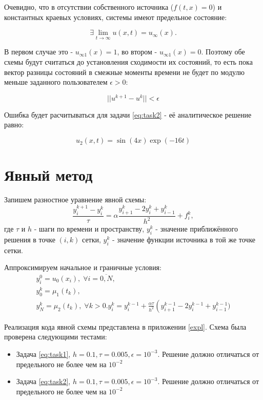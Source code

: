 Очевидно, что в отсутствии собственного источника ($f(t,x) = 0$) и константных краевых условиях, системы имеют предельное состояние:

\[\exists \lim\limits_{t \rightarrow \infty} u(x, t) = u_\infty (x).\]

В первом случае это - $u_{\infty1} (x) = 1$, во втором - $u_{\infty1} (x) = 0$. 
Поэтому обе схемы будут считаться до установления сходимости их состояний,
то есть пока вектор разницы состояний в смежные моменты времени не будет по модулю меньше заданного пользователем $\epsilon > 0$:

\[ ||u^{k+1} - u^k|| < \epsilon \]

Ошибка будет расчитываться для задачи \ref{eq:task2} - её аналитическое решение равно:

\[ u_2(x,t) = \sin{(4x)}\exp{(-16t)} \]

\newpage
\section{Явный метод}

Запишем разностное уравнение явной схемы:
$$\dfrac{y_i^{k+1} - y_i^{k}}{\tau} = \alpha \dfrac{y_{i+1}^{k} - 2 y_i^{k} + y_{i-1}^{k}}{h^2} + f_i^k,$$
где $\tau$ и $h$ - шаги по времени и пространству, $y_i^k$ - значение приближённого решения в точке $(i, k)$ сетки, $y_i^k$ - значение функции источника в той же точке сетки. 

Аппроксимируем начальное и граничные условия:
\begin{equation}
\begin{array}{l}
y_i^0 = u_0(x_i), \; \forall i = \overline{0, N},\\
y_0^k = \mu_1(t_k), \\
y_N^k = \mu_2(t_k), \; \forall k > 0.
y_i^k = y_i^{k-1} + \frac{\alpha \tau}{h^2} \left(y_{i+1}^{k-1} - 2 y_i^{k-1} + y_{i-1}^{k-1})
\end{array}
\end{equation}

Реализация кода явной схемы представлена в приложении \ref{expl}. Схема была проверена следующими тестами:

\begin{itemize}
\item Задача \ref{eq:task1}, $h=0.1, \tau=0.005, \epsilon=10^{-3}$. Решение должно отличаться от предельного не более чем на $10^{-2}$
\item Задача \ref{eq:task2}, $h=0.1, \tau=0.005, \epsilon=10^{-3}$. Решение должно отличаться от предельного не более чем на $10^{-2}$
\end{itemize}

